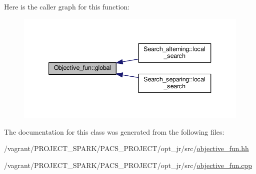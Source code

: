 Here is the caller graph for this function\-:\nopagebreak
\begin{figure}[H]
\begin{center}
\leavevmode
\includegraphics[width=340pt]{classObjective__fun_ae11b3facab75a7b7dc197d0a1a194d29_icgraph}
\end{center}
\end{figure}




The documentation for this class was generated from the following files\-:\begin{DoxyCompactItemize}
\item 
/vagrant/\-P\-R\-O\-J\-E\-C\-T\-\_\-\-S\-P\-A\-R\-K/\-P\-A\-C\-S\-\_\-\-P\-R\-O\-J\-E\-C\-T/opt\-\_\-jr/src/\hyperlink{objective__fun_8hh}{objective\-\_\-fun.\-hh}\item 
/vagrant/\-P\-R\-O\-J\-E\-C\-T\-\_\-\-S\-P\-A\-R\-K/\-P\-A\-C\-S\-\_\-\-P\-R\-O\-J\-E\-C\-T/opt\-\_\-jr/src/\hyperlink{objective__fun_8cpp}{objective\-\_\-fun.\-cpp}\end{DoxyCompactItemize}
